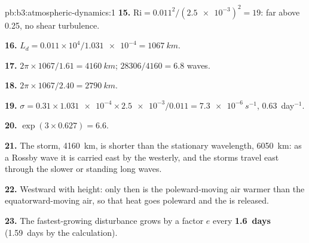 \begin{solution}{pb:b3:atmospheric-dynamics:1}
\textbf{15.} $\mathrm{Ri} = 0.011^2/(\num{2.5e-3})^2 = 19$: far above 0.25,
no shear turbulence.

\textbf{16.} $L_d = 0.011\times10^4/\num{1.031e-4} = \qty{1067}{km}$.

\textbf{17.} $2\pi\times1067/1.61 = \qty{4160}{km}$; $28306/4160 = 6.8$
waves.

\textbf{18.} $2\pi\times1067/2.40 = \qty{2790}{km}$.

\textbf{19.} $\sigma = 0.31\times\num{1.031e-4}\times\num{2.5e-3}/0.011 =
\qty{7.3e-6}{s^{-1}}$, \num{0.63}~day$^{-1}$.

\textbf{20.} $\exp(3\times0.627) = 6.6$.

\textbf{21.} The storm, \qty{4160}{km}, is shorter than the stationary
wavelength, \qty{6050}{km}: as a Rossby wave it is carried east by the
westerly, and the storms travel east through the slower or standing long
waves.

\textbf{22.} Westward with height: only then is the poleward-moving air
warmer than the equatorward-moving air, so that heat goes poleward and the
 is released.

\textbf{23.} The fastest-growing disturbance grows by a factor $e$ every
\textbf{\num[text-series-to-math=true]{1.6}~days} (\num{1.59}~days by the
calculation).
\end{solution}
